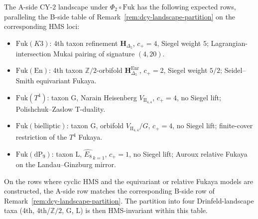 \begin{remark}
\label{rem:fukaya-landscape-summary}
The A-side CY-$2$ landscape under $\Phi_2\circ\mathrm{Fuk}$ has the
following expected rows, paralleling the B-side table of
Remark~\ref{rem:dcy-landscape-partition} on the corresponding HMS
loci:
\begin{itemize}
\item $\mathrm{Fuk}(K3)$: 4th taxon refinement
 $\mathbf{H}_{\Delta_5}$, $c_+ = 4$, Siegel weight $5$;
 Lagrangian-intersection Mukai pairing of signature $(4,20)$.
\item $\mathrm{Fuk}(\mathrm{En})$: 4th taxon $\mathbb{Z}/2$-orbifold
 $\mathbf{H}_{\Delta_5}^{\mathrm{Enr}}$, $c_+ = 2$, Siegel weight
 $5/2$; Seidel--Smith equivariant Fukaya.
\item $\mathrm{Fuk}(T^4)$: taxon G, Narain Heisenberg
 $V_{\mathrm{II}_{4,4}}$, $c_+ = 4$, no Siegel lift;
 Polishchuk--Zaslow T-duality.
\item $\mathrm{Fuk}(\mathrm{bielliptic})$: taxon G, orbifold
 $V_{\mathrm{II}_{4,4}}/G$, $c_+ = 4$, no Siegel lift; finite-cover
 restriction of the $T^4$ Fukaya.
\item $\mathrm{Fuk}(\mathrm{dP}_9)$: taxon L,
 $\widehat{E_8}_{\,k=1}$, $c_+ = 1$, no Siegel lift; Auroux
 relative Fukaya on the Landau--Ginzburg mirror.
\end{itemize}
On the rows where cyclic HMS and the equivariant or relative Fukaya
models are constructed, the A-side row matches the corresponding
B-side row of Remark~\ref{rem:dcy-landscape-partition}. The partition
into four Drinfeld-landscape taxa (4th, 4th/$\mathbb{Z}/2$, G, L) is
then HMS-invariant within this table.
\end{remark}

